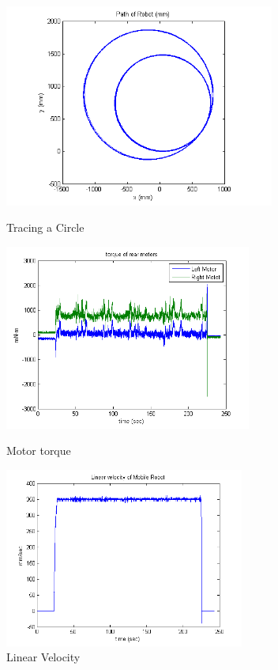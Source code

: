 \begin{figure}
	\begin{minipage}[t]{0.5\textwidth}
		\centering
		\includegraphics[width=3.5in]{Chapter5/fig/circle} 
		\caption{Tracing a Circle}\label{fig:circle}
	\end{minipage}
	\hfill
	\begin{minipage}[t]{0.5\textwidth}
		\centering
		\includegraphics[width=3.2in]{Chapter5/fig/cirTorq} 
		\caption{Motor torque}\label{fig:cirTorq}
	\end{minipage}
\begin{minipage}[t]{0.5\textwidth}
	\centering
	\includegraphics[width=3.1in]{Chapter5/fig/cirVel} 
	\caption{Linear Velocity}\label{fig:cirVel}
\end{minipage}

\end{figure}
